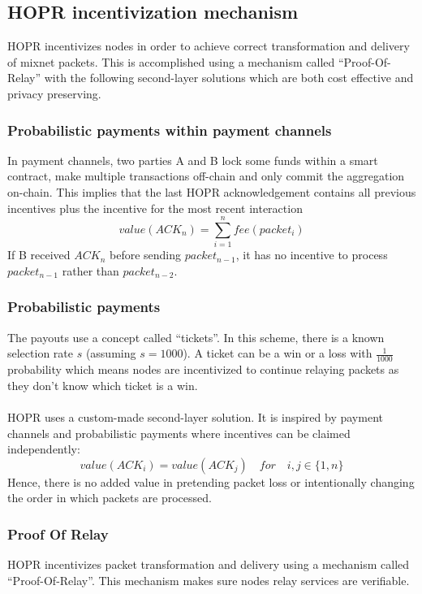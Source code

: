 \subsection{HOPR incentivization mechanism}
HOPR incentivizes nodes in order to achieve correct transformation and delivery of mixnet packets. 
This is accomplished using a mechanism called “Proof-Of-Relay” with the following second-layer solutions which are both cost effective and privacy preserving.

\subsubsection{Probabilistic payments within payment channels}
In payment channels, two parties A and B lock some funds within a smart contract, make multiple transactions off-chain and only commit the aggregation on-chain. 
This implies that the last HOPR acknowledgement contains all previous incentives plus the incentive for the most recent interaction 
   $$value(ACK_n) =\sum_{i=1}^nfee(packet_i)$$
If B received $ACK_n$ before sending $packet_{n-1}$, it has no incentive to process $packet_{n-1}$ rather than $packet_{n-2}$. 

\subsubsection*{Probabilistic payments}  
The payouts use a concept called “tickets”. In this scheme, there is a known selection rate $s$ (assuming $s=1000$).
A ticket can be a win or a loss with $\frac{1}{1000}$ probability which means nodes are incentivized to continue relaying packets as they don’t know which ticket is a win. 
\\~\\HOPR uses a custom-made second-layer solution. It is inspired by payment channels and probabilistic payments where incentives can be claimed independently: 
$$value ( ACK_i )=value ( ACK_j ) \quad for \quad i,j\in \{1,n\}$$
Hence, there is no added value in pretending packet loss or intentionally changing the order in which packets are processed. 

\subsubsection{Proof Of Relay}

HOPR incentivizes packet transformation and delivery using a mechanism called “Proof-Of-Relay”. 
This mechanism makes sure nodes relay services are verifiable.
